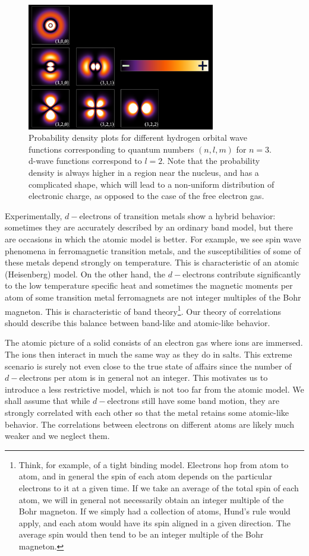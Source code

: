 \documentclass[10pt, twocolumn, twoside]{article}
\begin{document}
\begin{figure}[ht!]\label{fig:hydrogenWF}
\centering
\includegraphics[width = 8.2cm]{Hydrogen_Density_Plots.png}
\caption{Probability density plots for different hydrogen orbital wave functions corresponding to quantum numbers $(n, l, m)$ for $n = 3$. d-wave functions correspond to $l=2$. Note that the probability density is always higher in a region near the nucleus, and has a complicated shape, which will lead to a non-uniform distribution of electronic charge, as opposed to the case of the free electron gas.}
\end{figure}

Experimentally, $d-$electrons of transition metals show a hybrid behavior: sometimes they are accurately described by an ordinary band model, but there are occasions in which the atomic model is better. For example, we see spin wave phenomena in ferromagnetic transition metals, and the susceptibilities of some of these metals depend strongly on temperature. This is characteristic of an atomic (Heisenberg) model. On the other hand, the $d-$electrons contribute significantly to the low temperature specific heat and sometimes the magnetic moments per atom of some transition metal ferromagnets are not integer multiples of the Bohr magneton. This is characteristic of band theory\footnote{Think, for example, of a tight binding model. Electrons hop from atom to atom, and in general the spin of each atom depends on the particular electrons  to it at a given time. If we take an average of the total spin of each atom, we will in general not necessarily obtain an integer multiple of the Bohr magneton. If we simply had a collection of atoms, Hund's rule would apply, and each atom would have its spin aligned in a given direction. The average spin would then tend to be an integer multiple of the Bohr magneton.}. Our theory of correlations should describe this balance between band-like and atomic-like behavior.

The atomic picture of a solid consists of an electron gas where ions are immersed. The ions then interact in much the same way as they do in salts. This extreme scenario is surely not even close to the true state of affairs since the number of $d-$electrons per atom is in general not an integer. This motivates us to introduce a less restrictive model, which is not too far from the atomic model. We shall assume that while $d-$electrons still have some band motion, they are strongly correlated with each other so that the metal retains some atomic-like behavior. The correlations between electrons on different atoms are likely much weaker and we neglect them.
\end{document}
